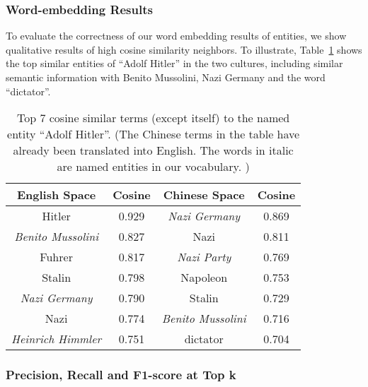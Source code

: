 \subsubsection{Word-embedding Results}

To evaluate the correctness of our word embedding results of entities, we
show qualitative results of high cosine similarity neighbors.
To illustrate, Table~\ref{tbl:embd} shows the top similar entities of
``Adolf Hitler'' in the two cultures, including
similar semantic information with Benito Mussolini, Nazi Germany and the word ``dictator''.

\begin{table}[th]
\small
\centering
\caption{Top 7 cosine similar terms (except itself) to the named entity ``Adolf Hitler''. (The Chinese terms in the table have already been translated into English. The words in italic are named entities in our vocabulary.   ) }
\label{tbl:embd}
\begin{tabular}{|c|c||c|c|}
\hline
\textbf{English Space} & \textbf{Cosine} & \textbf{Chinese Space} &
\textbf{Cosine}\\ \hline\hline
Hitler & 0.929 & \em{Nazi Germany}  & 0.869 \\ \hline
\em{Benito Mussolini} & 0.827 & Nazi  & 0.811 \\ \hline
Fuhrer & 0.817 & \em{Nazi Party}  & 0.769 \\ \hline

Stalin & 0.798 & Napoleon  & 0.753 \\ \hline
\em{Nazi Germany} & 0.790 & Stalin  & 0.729 \\ \hline
Nazi & 0.774 & \em{Benito Mussolini}  & 0.716 \\ \hline
\em{Heinrich Himmler} & 0.751 & dictator  & 0.704 \\ \hline
\end{tabular}
\end{table}

\subsubsection{Precision, Recall and F1-score at Top k}


